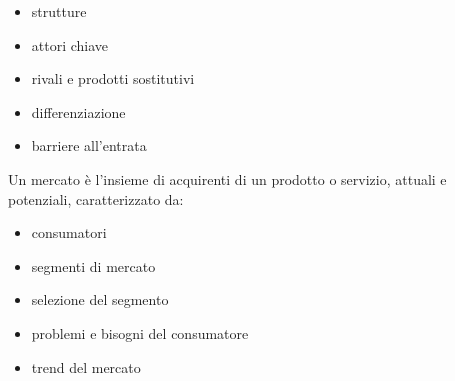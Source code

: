 \documentclass[answers, a4paper, 11pt]{exam}
\begin{document}
\begin{itemize}
    \item strutture
    \item attori chiave
    \item rivali e prodotti sostitutivi
    \item differenziazione
    \item barriere all'entrata
\end{itemize}

Un mercato è l'insieme di acquirenti di un prodotto o servizio, attuali e potenziali, caratterizzato da:

\begin{itemize}
    \item consumatori
    \item segmenti di mercato
    \item selezione del segmento
    \item problemi e bisogni del consumatore
    \item trend del mercato
\end{itemize}
\end{document}

